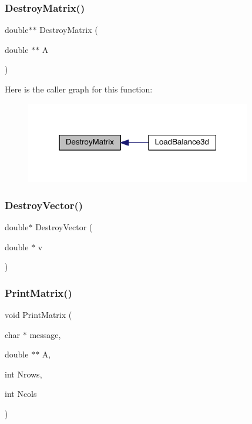 \mbox{\label{a00602_a93ff2c99f019051b3cdeba84fd798332}} 
\subsubsection{\texorpdfstring{Destroy\+Matrix()}{DestroyMatrix()}}
{\footnotesize\ttfamily double$\ast$$\ast$ Destroy\+Matrix (\begin{DoxyParamCaption}\item[{double $\ast$$\ast$}]{A }\end{DoxyParamCaption})}

Here is the caller graph for this function\+:\nopagebreak
\begin{figure}[H]
\begin{center}
\leavevmode
\includegraphics[width=280pt]{a00602_a93ff2c99f019051b3cdeba84fd798332_icgraph}
\end{center}
\end{figure}
\mbox{\label{a00602_a80d1cd97ff27b4af78dcae4720b12ec2}} 
\subsubsection{\texorpdfstring{Destroy\+Vector()}{DestroyVector()}}
{\footnotesize\ttfamily double$\ast$ Destroy\+Vector (\begin{DoxyParamCaption}\item[{double $\ast$}]{v }\end{DoxyParamCaption})}

\mbox{\label{a00602_a75942b12ae1b0172595c4d482b8203c0}} 
\subsubsection{\texorpdfstring{Print\+Matrix()}{PrintMatrix()}}
{\footnotesize\ttfamily void Print\+Matrix (\begin{DoxyParamCaption}\item[{char $\ast$}]{message,  }\item[{double $\ast$$\ast$}]{A,  }\item[{int}]{Nrows,  }\item[{int}]{Ncols }\end{DoxyParamCaption})}

